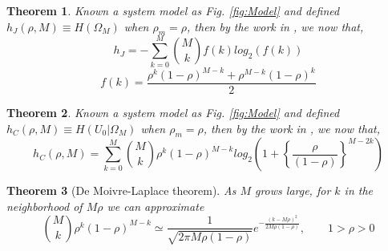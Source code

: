 \documentclass[a4paper,10pt]{article}
\newtheorem{mytheorem}{Theorem}
\begin{document}
\begin{mdframed}[style=MDFStyGrayScreen]
\begin{mytheorem}
 \label{prop:OmegaM}
 Known a system model as Fig. \ref{fig:Model} and defined $h_{J}(\rho,M)\equiv H(\Omega_M)$ 
 when $\rho_m=\rho$, then
 by the work in \cite[p.~37]{shomega}, we now that,
\begin{equation}\label{eq:OmegaMP1}
 h_{J} = -\sum_{k=0}^M \binom{M}{k}f(k)log_2( f(k) )
\end{equation}
\begin{equation}\label{eq:OmegaMP2}
f(k)=\frac{ \rho^k (1-\rho)^{M-k} + \rho^{M-k} (1-\rho)^k }{2}
\end{equation}
\end{mytheorem}
\end{mdframed}


\begin{mdframed}[style=MDFStyGrayScreen]
\begin{mytheorem}
 \label{prop:h0OmegaM}
 Known a system model as Fig. \ref{fig:Model} and defined $h_{C}(\rho,M)\equiv H(U_0|\Omega_M)$ 
 when $\rho_m=\rho$, then
 by the work in \cite[p.~37]{shu0omega}, we now that,
\begin{equation}\label{eq:h0OmegaMP}
h_{C}(\rho,M)  = \sum_{k=0}^M \binom{M}{k} \rho^k (1-\rho)^{M-k} log_2\left ( 1 + \left\{\frac{\rho}{(1-\rho)}\right\}^{M-2k} \right )    
\end{equation}
\end{mytheorem}
\end{mdframed}


\begin{mdframed}[style=MDFStyGrayScreen]
\begin{mytheorem}[De Moivre-Laplace theorem]
 \label{teo:MoivreLaplace}
As $M$ grows large, for $k$ in the neighborhood of $M\rho$ we can approximate
\begin{equation}\label{eq:MoivreLaplace}
 {M \choose k} \rho^{k}(1-\rho)^{M-k}\simeq \frac{1}{\sqrt{2\pi M\rho (1-\rho)}} e^{-\frac{(k-M\rho)^{2}}{2M\rho (1-\rho)}}, \qquad   1>\rho>0 
\end{equation}
\end{mytheorem}
\end{mdframed}
\end{document}
